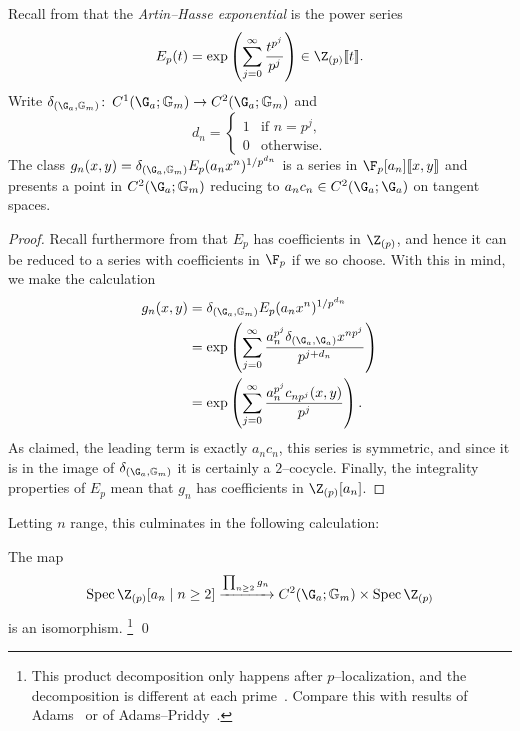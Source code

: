 \begin{lemma}
Recall from  that the \textit{Artin--Hasse exponential} is the power series \[E_p(t) = \exp\left( \sum_{j=0}^\infty \frac{t^{p^j}}{p^j} \right) \in \Z_{(p)}\ps{t}.\]
Write \(\delta_{(\G_a, \Gm)}\co C^1(\G_a; \Gm) \to C^2(\G_a; \Gm)\) and \[d_n = \begin{cases} 1 & \text{if \(n = p^j\)}, \\ 0 & \text{otherwise}. \end{cases}\]
The class \(g_n(x, y) = \delta_{(\G_a,\Gm)} E_p(a_n x^n)^{1/p^{d_n}}\) is a series in \(\F_p[a_n]\ps{x,y}\) and presents a point in \(C^2(\G_a; \Gm)\) reducing to \(a_n c_n \in C^2(\G_a; \G_a)\) on tangent spaces.
\end{lemma}
\begin{proof}
Recall furthermore from  that \(E_p\) has coefficients in \(\Z_{(p)}\), and hence it can be reduced to a series with coefficients in \(\F_p\) if we so choose.
 With this in mind, we make the calculation
\begin{align*}
g_n(x, y) & = \delta_{(\G_a, \Gm)} E_p(a_n x^n)^{1/p^{d_n}} \\
& = \exp\left( \sum_{j=0}^\infty \frac{a_n^{p^j} \delta_{(\G_a, \G_a)} x^{np^j}}{p^{j + d_n}} \right) \\
& = \exp\left( \sum_{j=0}^\infty \frac{a_n^{p^j} c_{np^j}(x, y)}{p^j} \right).
\end{align*}
As claimed, the leading term is exactly \(a_n c_n\), this series is symmetric, and since it is in the image of \(\delta_{(\G_a, \Gm)}\) it is certainly a \(2\)--cocycle.
Finally, the integrality properties of \(E_p\) mean that \(g_n\) has coefficients in \(\Z_{(p)}[a_n]\).
\end{proof}

Letting \(n\) range, this culminates in the following calculation:

\begin{lemma}
The map \[\Spec \Z_{(p)}[a_n \mid n \ge 2] \xrightarrow{\prod_{n \ge 2} g_n} C^2(\G_a; \Gm) \times \Spec \Z_{(p)}\] is an isomorphism.%
\footnote{%
This product decomposition only happens after \(p\)--localization, and the decomposition is different at each prime~\cite[Section 3.3]{AHSTheoremOfTheCube}.
Compare this with results of Adams~\cite{AdamsPrimitiveElts} or of Adams--Priddy~\cite{AdamsPriddy}.
}
\qed
\end{lemma}

